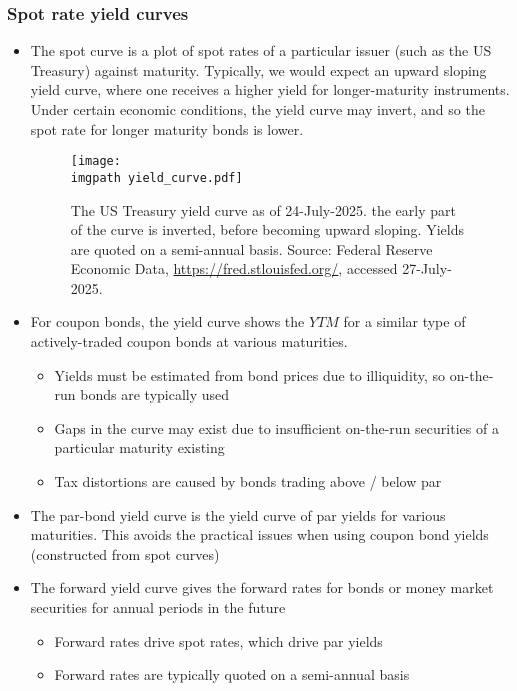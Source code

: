 \documentclass[../notes_compiled.tex]{subfiles}
\begin{document}
\subsubsection{Spot rate yield curves}
\begin{itemize}
\item The spot curve is a plot of spot rates of a particular issuer (such as the US Treasury) against maturity. Typically, we would expect an upward sloping yield curve, where one receives a higher yield for longer-maturity instruments. Under certain economic conditions, the yield curve may invert, and so the spot rate for longer maturity bonds is lower.

\begin{figure}[h]
  \centering
  \texttt{[image: \\imgpath yield\_curve.pdf]}
  \caption{The US Treasury yield curve as of 24-July-2025. the early part of the curve is inverted, before becoming upward sloping. Yields are quoted on a semi-annual basis. Source: Federal Reserve Economic Data, \href{https://fred.stlouisfed.org/}{https://fred.stlouisfed.org/}, accessed 27-July-2025.}
\end{figure}

\item For coupon bonds, the yield curve shows the $YTM$ for a similar type of actively-traded coupon bonds at various maturities.
\begin{itemize}
\item Yields must be estimated from bond prices due to illiquidity, so on-the-run bonds are typically used
\item Gaps in the curve may exist due to insufficient on-the-run securities of a particular maturity existing
\item Tax distortions are caused by bonds trading above / below par
\end{itemize}

\item The par-bond yield curve is the yield curve of par yields for various maturities. This avoids the practical issues when using coupon bond yields (constructed from spot curves)

\item The forward yield curve gives the forward rates for bonds or money market securities for annual periods in the future
\begin{itemize}
\item Forward rates drive spot rates, which drive par yields
\item Forward rates are typically quoted on a semi-annual basis
\end{itemize}
\end{itemize}
\end{document}
